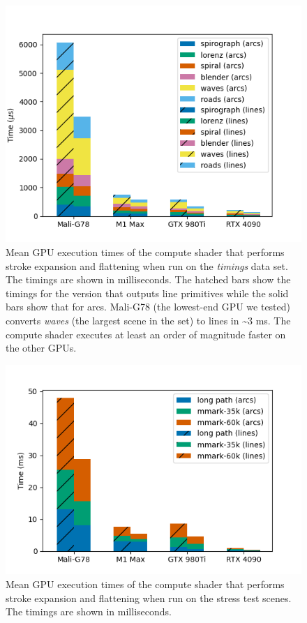 \documentclass[sigconf, nonacm]{acmart}
\begin{document}
\begin{figure}
    \includegraphics[scale=0.69]{nehab_gpu_timings}
    \caption{Mean GPU execution times of the compute shader that performs stroke expansion and flattening when run on the \citet{Nehab2020} \emph{timings} data set. The timings are shown in milliseconds. The hatched bars show the timings for the version that outputs line primitives while the solid bars show that for arcs. Mali-G78 (the lowest-end GPU we tested) converts \emph{waves} (the largest scene in the set) to lines in \textasciitilde3 ms. The compute shader executes at least an order of magnitude faster on the other GPUs.}
    \label{fig:nehab-gpu-timings}
\end{figure}

\begin{figure}
    \includegraphics[scale=0.73]{test_scenes_gpu_timings}
    \caption{Mean GPU execution times of the compute shader that performs stroke expansion and flattening when run on the stress test scenes. The timings are shown in milliseconds.}
    \label{fig:test-scenes-gpu-timings}
\end{figure}
\end{document}
